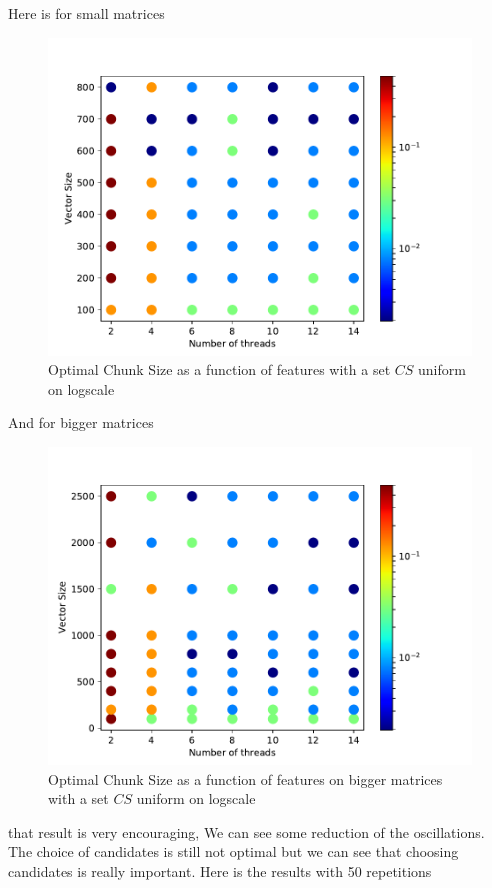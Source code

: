 \documentclass[12pt]{article}
\begin{document}
Here is for small matrices

\begin{figure}[H]
	\centering
	\includegraphics[width=120mm]{images/chunk_size_function_matrix_uniform_log.pdf}
	\caption{Optimal Chunk Size as a function of features with a set $CS$ uniform on logscale}
\end{figure}

And for bigger matrices
\begin{figure}[H]
	\centering
	\includegraphics[width=120mm]{images/chunk_size_function_matrix_uniform_log_big.pdf}
	\caption{Optimal Chunk Size as a function of features on bigger matrices with a set $CS$ uniform on logscale }
\end{figure}

that result is very encouraging, We can see some reduction of the oscillations. The choice of candidates is still not optimal but we can see that choosing candidates is really important. Here is the results with 50 repetitions
\end{document}
